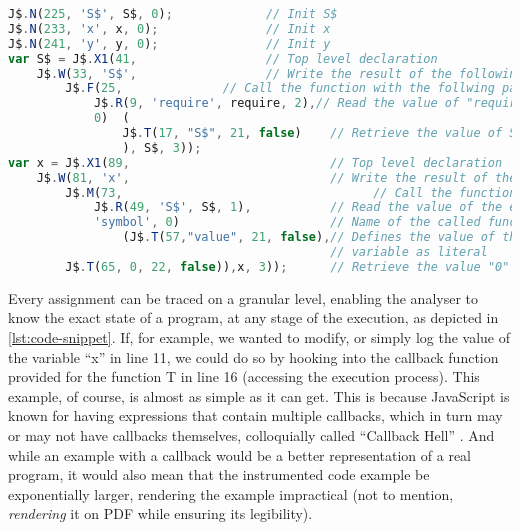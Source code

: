 \begin{lstlisting}[float, language=JavaScript, caption={[Instrumented program snippet]Lines 1 and 4 of the program snippet \autoref{lst:expose-sample-program}, instrumented by Jalangi2, with explanation}, label={lst:code-snippet}]
J$.N(225, 'S$', S$, 0);             // Init S$
J$.N(233, 'x', x, 0);               // Init x
J$.N(241, 'y', y, 0);               // Init y
var S$ = J$.X1(41,                  // Top level declaration
    J$.W(33, 'S$',                  // Write the result of the following:
        J$.F(25,              // Call the function with the follwing parameter:
            J$.R(9, 'require', require, 2),// Read the value of "require"
            0)  (
                J$.T(17, "S$", 21, false)    // Retrieve the value of S$
                ), S$, 3));
var x = J$.X1(89,                            // Top level declaration
    J$.W(81, 'x',                            // Write the result of the following:
        J$.M(73,                                   // Call the function of:
            J$.R(49, 'S$', S$, 1),           // Read the value of the expression S$
            'symbol', 0)                     // Name of the called function
                (J$.T(57,"value", 21, false),// Defines the value of the 
                                             // variable as literal
        J$.T(65, 0, 22, false)),x, 3));      // Retrieve the value "0"
\end{lstlisting}
Every assignment can be traced on a granular level, enabling the analyser to know the exact state of a program, at any stage of the execution, as depicted in \autoref{lst:code-snippet}. If, for example, we wanted to modify, or simply log the value of the variable “x” in line 11, we could do so by hooking into the callback function provided for the function T in line 16 (accessing the execution process).
This example, of course, is almost as simple as it can get. This is because JavaScript is known for having expressions that contain multiple callbacks, which in turn may or may not have callbacks themselves, colloquially called “Callback Hell” \cite{max_ogden_callback_2019}. And while an example with a callback would be a better representation of a real program, it would also mean that the instrumented code example be exponentially larger, rendering the example impractical (not to mention, \textit{rendering} it on PDF while ensuring its legibility). \\


